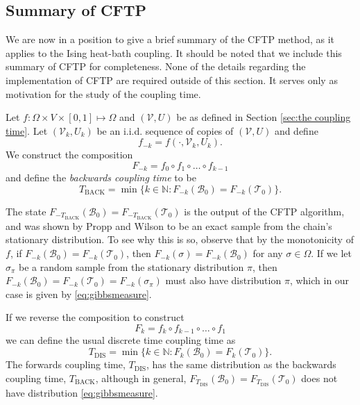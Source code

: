 	\subsection{Summary of CFTP}
	\label{sec:summary of CFTP}
	We are now in a position to give a brief summary of the CFTP method, as it applies to the Ising heat-bath coupling. It should be noted that we include this summary of CFTP for completeness. None of the details regarding the implementation of CFTP are required outside of this section. It serves only as motivation for the study of the coupling time.

	Let $f: \Omega \times V \times [0,1] \mapsto \Omega$ and $(\mathcal{V}, U)$ be as defined in Section \ref{sec:the coupling time}. Let $(\mathcal{V}_k, U_k)$ be an i.i.d. sequence of copies of $(\mathcal{V}, U)$ and define 
	\begin{equation}
		f_{-k} = f(\cdot, \mathcal{V}_k, U_k).
	\end{equation}
	We construct the composition
	\begin{equation}
		F_{-k} = f_0 \circ f_1 \circ \dots \circ f_{k-1}
	\end{equation}
	and define the \emph{backwards coupling time} to be
	\begin{equation}
		T_\mathrm{BACK} = \min\{k \in \mathbb{N} : F_{-k}(\mathscr{B}_0) = F_{-k}(\mathscr{T}_0)\}.
	\end{equation}

	The state $F_{-T_\mathrm{BACK}}(\mathscr{B}_0) = F_{-T_\mathrm{BACK}}(\mathscr{T}_0)$ is the output of the CFTP algorithm, and was shown by Propp and Wilson \cite{Propp1996-cf} to be an exact sample from the chain's stationary distribution. To see why this is so, observe that by the monotonicity of $f$, if $F_{-k}(\mathscr{B}_0) = F_{-k}(\mathscr{T}_0)$, then $F_{-k}(\sigma) = F_{-k}(\mathscr{B}_0)$ for any $\sigma \in \Omega$. If we let $\sigma_\pi$ be a random sample from the stationary distribution $\pi$, then $F_{-k}(\mathscr{B}_0) = F_{-k}(\mathscr{T}_0) = F_{-k}(\sigma_\pi)$ must also have distribution $\pi$, which in our case is given by \eqref{eq:gibbsmeasure}.
	
	If we reverse the composition to construct
	\begin{equation}
		F_{k} = f_{k} \circ f_{k-1} \circ \dots \circ f_1
	\end{equation}
	we can define the usual discrete time coupling time as
	\begin{equation}
		T_\mathrm{DIS} =  \min\{k \in \mathbb{N} : F_{k}(\mathscr{B}_0) = F_{k}(\mathscr{T}_0)\}.
	\end{equation}
	The forwards coupling time, $T_\mathrm{DIS}$, has the same distribution as the backwards coupling time, $T_\mathrm{BACK}$, although in general, $F_{T_\mathrm{DIS}}(\mathscr{B}_0) = F_{T_\mathrm{DIS}}(\mathscr{T}_0)$ does not have distribution \eqref{eq:gibbsmeasure}.

